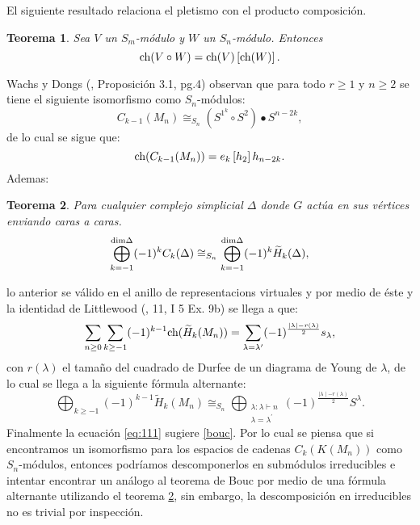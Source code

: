 \documentclass[12pt]{book}
\newtheorem{theorem}{Teorema}[section]
\theoremstyle{definition}
\newcounter{in}
\begin{document}
El siguiente resultado relaciona el pletismo con el producto
composición.
\begin{theorem}
  \label{cp_po}
  Sea $V$ un $S_{m}$-módulo y $W$ un $S_{n}$-módulo. Entonces
  \begin{equation}
    \label{eq:109}
    \textup{ch}(V \circ W) = \textup{ch}(V)\left [ \textup{ch}(W) \right ].
  \end{equation}
\end{theorem}
Wachs y Dongs \normalfont(\cite{dong2002combinatorial}, Proposición 3.1,
pg.4) observan que para todo $r \geq 1$ y $n \geq 2$ se tiene el
siguiente isomorfismo como $S_n$-módulos:
\begin{equation}
  \label{eq:93}
  C_{k-1}(M_n) \cong_{S_{n}} (S^{1^{k}} \circ S^{2}) \bullet S^{n-2k},
\end{equation}
 de lo cual se sigue que:
\begin{equation}
  \label{eq:92}
  \textup{ch}(C_{k-1}(M_n)) = e_{k}\left [ h_{2} \right ]h_{n-2k}.
\end{equation}
Ademas:
\begin{theorem}
  \label{hopf}
  Para cualquier complejo simplicial $\Delta$ donde $G$ actúa en sus
  vértices enviando caras a caras.
  \begin{equation}
    \label{eq:110}
    \bigoplus_{k = -1}^{\textup{dim} \Delta}(-1)^{k}C_{k}(\Delta)\cong_{S_{n}} \bigoplus_{k = -1}^{\textup{dim} \Delta}(-1)^{k}\widetilde{H}_k(\Delta),
  \end{equation}
\end{theorem}
lo anterior se válido en el anillo de representacions virtuales y por
medio de éste y la identidad de Littlewood
\normalfont(\cite{macdonald1998symmetric}, 11, I 5 Ex. 9b) se llega a
que:
\begin{equation}
  \label{eq:90}
\sum_{n \geq 0} \sum_{k \geq -1}(-1)^{k-1}\textup{ch}(\widetilde{H}_k(M_n)) = \sum_{\lambda = {\lambda}'}(-1)^{\frac{\mid \lambda \mid - r(\lambda)}{2}}s_{\lambda},  
\end{equation}
con $r(\lambda)$ el tamaño del cuadrado de Durfee de un diagrama de
Young de $\lambda$, de lo cual se llega a la siguiente fórmula
alternante:
\begin{equation}
  \label{eq:111}
  \bigoplus_{k \geq -1}(-1)^{k-1}\widetilde{H}_k(M_n) \cong_{S_{n}} \bigoplus_{\substack{\lambda:\lambda\vdash n\\
      \lambda=\lambda^{'}}} (-1)^{\frac{\mid \lambda \mid - r(\lambda)}{2}}S^{\lambda}.
\end{equation}
  Finalmente la ecuación \ref{eq:111} sugiere \ref{bouc}. Por lo
  cual se piensa que si encontramos un isomorfismo para los espacios
  de cadenas $C_k(K(M_n))$ como $S_n$-módulos, entonces podríamos
  descomponerlos en submódulos irreducibles e intentar encontrar un
  análogo al teorema de Bouc por medio de una fórmula alternante
  utilizando el teorema \ref{hopf}, sin embargo, la descomposición en
  irreducibles no es trivial por inspección.
\end{document}
